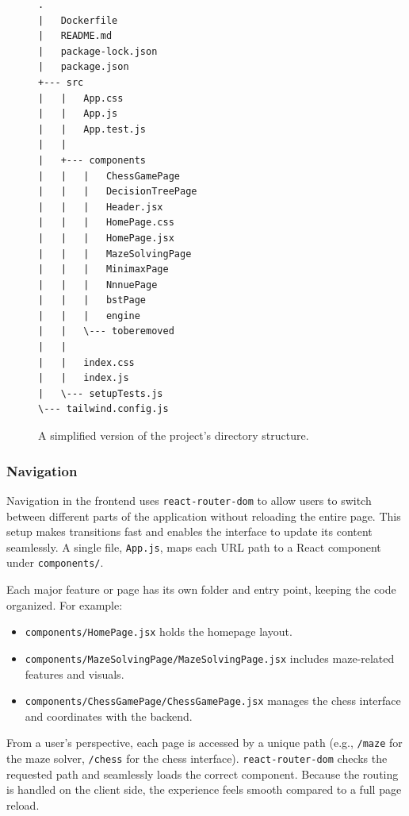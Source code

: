 \documentclass[12pt,a4paper]{article}
\begin{document}
\begin{figure}[ht]
  \begin{center}
    \begin{minipage}{0.5\linewidth} %
\begin{lstlisting}[numbers=none,frame=none,basicstyle=\ttfamily\footnotesize,breaklines=true]
.
|   Dockerfile
|   README.md
|   package-lock.json
|   package.json
+--- src
|   |   App.css
|   |   App.js
|   |   App.test.js
|   |
|   +--- components
|   |   |   ChessGamePage
|   |   |   DecisionTreePage
|   |   |   Header.jsx
|   |   |   HomePage.css
|   |   |   HomePage.jsx
|   |   |   MazeSolvingPage
|   |   |   MinimaxPage
|   |   |   NnnuePage
|   |   |   bstPage
|   |   |   engine
|   |   \--- toberemoved
|   |
|   |   index.css
|   |   index.js
|   \--- setupTests.js
\--- tailwind.config.js
\end{lstlisting}
    \end{minipage}
  \end{center}
  \caption{A simplified version of the project's directory structure.}
  \label{fig:directory-structure1}
\end{figure}

  \subsubsection{Navigation}

Navigation in the frontend uses \texttt{react-router-dom} to allow users to switch between different parts of the application without reloading the entire page. This setup makes transitions fast and enables the interface to update its content seamlessly. A single file, \texttt{App.js}, maps each URL path to a React component under \texttt{components/}.

Each major feature or page has its own folder and entry point, keeping the code organized. For example: \begin{itemize} \item \texttt{components/HomePage.jsx} holds the homepage layout. \item \texttt{components/MazeSolvingPage/MazeSolvingPage.jsx} includes maze-related features and visuals. \item \texttt{components/ChessGamePage/ChessGamePage.jsx} manages the chess interface and coordinates with the backend. \end{itemize}

From a user’s perspective, each page is accessed by a unique path (e.g., \texttt{/maze} for the maze solver, \texttt{/chess} for the chess interface). \texttt{react-router-dom} checks the requested path and seamlessly loads the correct component. Because the routing is handled on the client side, the experience feels smooth compared to a full page reload.
\end{document}
